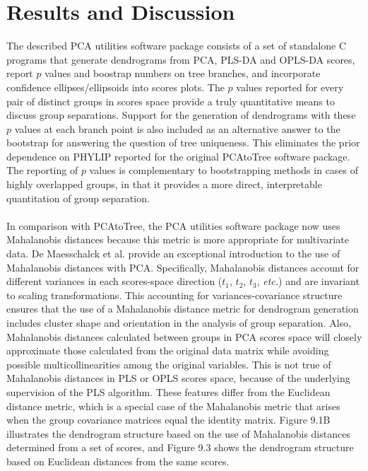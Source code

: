\section{Results and Discussion}

\begin{doublespace}
The described PCA utilities software package consists of a set of standalone
C programs that generate dendrograms from PCA, PLS-DA and OPLS-DA scores,
report $p$ values and boostrap numbers on tree branches, and incorporate
confidence ellipses/ellipsoids into scores plots. The $p$ values reported for
every pair of distinct groups in scores space provide a truly quantitative
means to discuss group separations. Support for the generation of dendrograms
with these $p$ values at each branch point is also included as an alternative
answer to the bootstrap for answering the question of tree uniqueness. This
eliminates the prior dependence on PHYLIP \cite{retief:mmbio2000}
reported for the original PCAtoTree \cite{werth:abio2010} software
package. The reporting of $p$ values is complementary to bootstrapping methods
in cases of highly overlapped groups, in that it provides a more direct,
interpretable quantitation of group separation.
\\\\
In comparison with PCAtoTree, the PCA utilities software package now uses
Mahalanobis distances because this metric is more appropriate for multivariate
data. De Maesschalck et al. \cite{demaesschalck:cils2000} provide an
exceptional introduction to the use of Mahalanobis distances with PCA.
Specifically, Mahalanobis distances account for different variances in each
scores-space direction ($t_1$, $t_2$, $t_3$, \emph{etc.}) and are invariant
to scaling transformations. This accounting for variances-covariance structure
ensures that the use of a Mahalanobis distance metric for dendrogram generation
includes cluster shape and orientation in the analysis of group separation.
Also, Mahalanobis distances calculated between groups in PCA scores space will
closely approximate those calculated from the original data matrix while
avoiding possible multicollinearities among the original variables. This is
not true of Mahalanobis distances in PLS or OPLS scores space, because of the
underlying supervision of the PLS algorithm. These features differ from the
Euclidean distance metric, which is a special case of the Mahalanobis metric
that arises when the group covariance matrices equal the identity matrix.
Figure 9.1B illustrates the dendrogram structure based on the use of
Mahalanobis distances determined from a set of scores, and Figure 9.3 shows the
dendrogram structure based on Euclidean distances from the same scores.
\end{doublespace}

